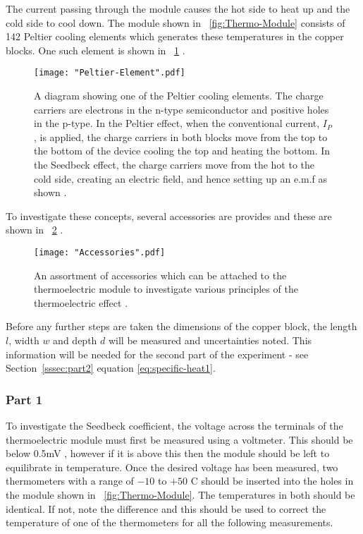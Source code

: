 \documentclass{article}
\newcommand{\figref}[2][\figurename~]{#1\ref{#2}}
\newcommand{\secref}[2][Section~]{#1\ref{#2}}
\begin{document}
\vspace{2mm}
\noindent
The current passing through the module causes the hot side to heat up and the cold side to cool down. The module shown in \figref{fig:Thermo-Module} consists of 142 Peltier cooling elements \cite{Paper02} which generates these temperatures in the copper blocks. One such element is shown in \figref{fig:Peltier-element} \cite{Paper02}.

\begin{figure}[h]
\centering
\texttt{[image: "Peltier-Element".pdf]}
\caption{A diagram showing one of the Peltier cooling elements. The charge carriers are electrons in the n-type semiconductor and positive holes in the p-type. In the Peltier effect,  when the conventional current, $I_P$, is applied, the charge carriers in both blocks move from the top to the bottom of the device \cite{Paper02} cooling the top and heating the bottom. In the Seedbeck effect, the charge carriers move from the hot to the cold side, creating an electric field, and hence setting up an e.m.f as shown \cite{Paper02}.}
\label{fig:Peltier-element}
\end{figure}

\newpage
\vspace{2mm}  
\noindent
To investigate these concepts, several accessories are provides and these are shown in \figref{fig:accessories} \cite{Paper02}.

\begin{figure}[h]
\centering
\texttt{[image: "Accessories".pdf]}
\caption{An assortment of accessories which can be attached to the thermoelectric module to investigate various principles of the thermoelectric effect \cite{Paper02}.}
\label{fig:accessories}
\end{figure}

\vspace{2mm}  
\noindent    
Before any further steps are taken the dimensions of the copper block, the length $l$, width $w$ and depth $d$ will be measured and uncertainties noted. This information will be needed for the second part of the experiment - see \secref{sssec:part2} equation \eqref{eq:specific-heat1}. 

\subsubsection{Part 1}
\label{sssec:part1}

To investigate the Seedbeck coefficient, the voltage across the terminals of the thermoelectric module must first be measured using a voltmeter. This should be below 0.5mV \cite{Paper02}, however if it is above this then the module should be left to equilibrate in temperature. Once the desired voltage has been measured, two thermometers with a range of $-10$ to $+50$ C should be inserted into the holes in the module shown in \figref{fig:Thermo-Module}. The temperatures in both should be identical. If not, note the difference and this should be used to correct the temperature of one of the thermometers for all the following measurements.
\end{document}
